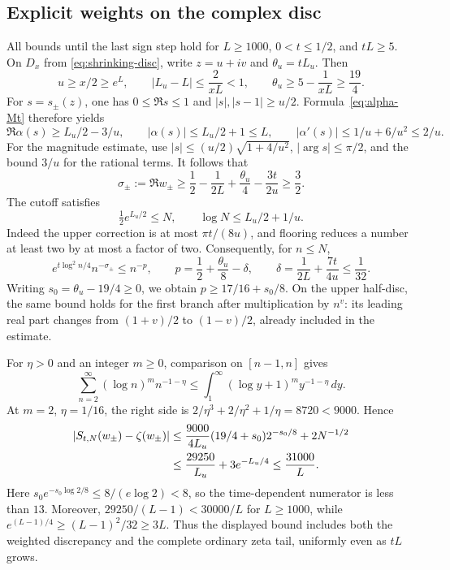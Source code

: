 \documentclass[11pt]{article}
\numberwithin{equation}{section}
\theoremstyle{definition}
\theoremstyle{remark}
\newcommand{\dd}{\,d}
\begin{document}
\subsection{Explicit weights on the complex disc}
All bounds until the last sign step hold for $L\ge1000$,
$0<t\le1/2$, and $tL\ge5$. On $D_x$ from
\eqref{eq:shrinking-disc}, write $z=u+iv$ and $\theta_u=tL_u$. Then
\begin{equation}
 u\ge x/2\ge e^L,\qquad |L_u-L|\le\frac2{xL}<1,
 \qquad\theta_u\ge5-\frac1{xL}\ge\frac{19}{4}.
 \label{eq:effective-disc-geometry}
\end{equation}
For $s=s_\pm(z)$, one has $0\le\Re s\le1$ and
$|s|,|s-1|\ge u/2$. Formula~\eqref{eq:alpha-Mt} therefore yields
\begin{equation}
 \Re\alpha(s)\ge L_u/2-3/u,\qquad
 |\alpha(s)|\le L_u/2+1\le L,
 \qquad |\alpha'(s)|\le1/u+6/u^2\le2/u.
 \label{eq:effective-alpha-disc}
\end{equation}
For the magnitude estimate, use
$|s|\le(u/2)\sqrt{1+4/u^2}$, $|\arg s|\le\pi/2$, and the bound
$3/u$ for the rational terms. It follows that
\begin{equation}
 \sigma_\pm:=\Re w_\pm
 \ge\frac12-\frac1{2L}+\frac{\theta_u}{4}-\frac{3t}{2u}
 \ge\frac32.
 \label{eq:effective-zeta-half-plane}
\end{equation}
The cutoff satisfies
\[
 \tfrac12e^{L_u/2}\le N,\qquad\log N\le L_u/2+1/u.
\]
Indeed the upper correction is at most $\pi t/(8u)$, and flooring
reduces a number at least two by at most a factor of two.
Consequently, for $n\le N$,
\begin{equation}
 e^{t\log^2n/4}n^{-\sigma_\pm}\le n^{-p},\qquad
 p=\frac12+\frac{\theta_u}{8}-\delta,\qquad
 \delta=\frac1{2L}+\frac{7t}{4u}\le\frac1{32}.
 \label{eq:effective-weight}
\end{equation}
Writing $s_0=\theta_u-19/4\ge0$, we obtain
$p\ge17/16+s_0/8$. On the upper half-disc, the same bound holds for
the first branch after multiplication by $n^v$: its leading real part
changes from $(1+v)/2$ to $(1-v)/2$, already included in the estimate.

For $\eta>0$ and an integer $m\ge0$, comparison on $[n-1,n]$ gives
\begin{equation}
 \sum_{n=2}^{\infty}(\log n)^m n^{-1-\eta}
 \le\int_1^\infty(\log y+1)^m y^{-1-\eta}\dd y.
 \label{eq:effective-log-moments}
\end{equation}
At $m=2$, $\eta=1/16$, the right side is
$2/\eta^3+2/\eta^2+1/\eta=8720<9000$. Hence
\begin{align}
 |S_{t,N}(w_\pm)-\zeta(w_\pm)|
 &\le\frac{9000}{4L_u}(19/4+s_0)2^{-s_0/8}+2N^{-1/2}
 \notag\\
 &\le\frac{29250}{L_u}+3e^{-L_u/4}
 \le\frac{31000}{L}.
 \label{eq:effective-sum-discrepancy}
\end{align}
Here $s_0e^{-s_0\log2/8}\le8/(e\log2)<8$, so the time-dependent
numerator is less than $13$. Moreover,
$29250/(L-1)<30000/L$ for $L\ge1000$, while
$e^{(L-1)/4}\ge(L-1)^2/32\ge3L$. Thus the displayed bound includes
both the weighted discrepancy and the complete ordinary zeta tail,
uniformly even as $tL$ grows.
\end{document}
